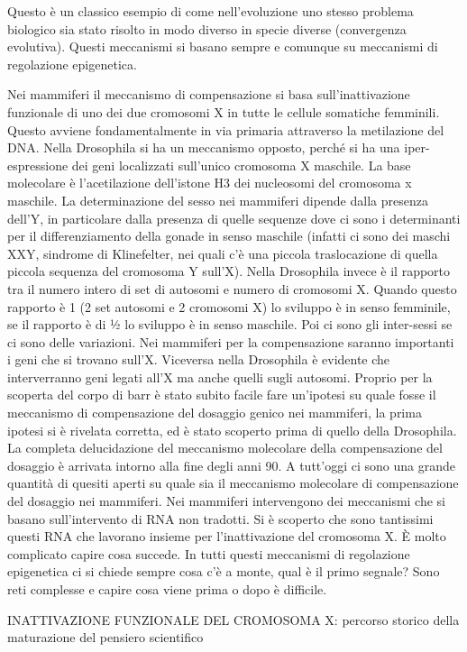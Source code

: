 \documentclass[11pt]{book}
\begin{document}
Questo è un classico esempio di come nell’evoluzione uno stesso problema biologico sia stato risolto in modo diverso in specie diverse (convergenza evolutiva). Questi meccanismi si basano sempre e comunque su meccanismi di regolazione epigenetica.

Nei mammiferi il meccanismo di compensazione si basa sull’inattivazione funzionale di uno dei due cromosomi X in tutte le cellule somatiche femminili. Questo avviene fondamentalmente in via primaria attraverso la metilazione del DNA. Nella Drosophila si ha un meccanismo opposto, perché si ha una iper-espressione dei geni localizzati sull’unico cromosoma X maschile.
La base molecolare è l’acetilazione dell’istone H3 dei nucleosomi del cromosoma x maschile. La determinazione del sesso nei mammiferi dipende dalla presenza dell’Y, in particolare dalla presenza di quelle sequenze dove ci sono i determinanti per il differenziamento della gonade in senso maschile (infatti ci sono dei maschi XXY, sindrome di Klinefelter, nei quali c’è una piccola traslocazione di quella piccola sequenza del cromosoma Y sull’X). Nella Drosophila invece è il rapporto tra il numero intero di set di autosomi e numero di cromosomi X. Quando questo rapporto è 1 (2 set autosomi e 2 cromosomi X) lo sviluppo è in senso femminile, se il rapporto è di ½ lo sviluppo è in senso maschile. Poi ci sono gli inter-sessi se ci sono delle variazioni.
Nei mammiferi per la compensazione saranno importanti i geni che si trovano sull’X. Viceversa nella Drosophila è evidente che interverranno geni legati all’X ma anche quelli sugli autosomi.
Proprio per la scoperta del corpo di barr è stato subito facile fare un’ipotesi su quale fosse il meccanismo di compensazione del dosaggio genico nei mammiferi, la prima ipotesi si è rivelata corretta, ed è stato scoperto prima di quello della Drosophila. La completa delucidazione del meccanismo molecolare della compensazione del dosaggio è arrivata intorno alla fine degli anni 90.
A tutt’oggi ci sono una grande quantità di quesiti aperti su quale sia il meccanismo molecolare di compensazione del dosaggio nei mammiferi.
Nei mammiferi intervengono dei meccanismi che si basano sull’intervento di RNA non tradotti. Si è scoperto che sono tantissimi questi RNA che lavorano insieme per l’inattivazione del cromosoma X. È molto complicato capire cosa succede. In tutti questi meccanismi di regolazione epigenetica ci si chiede sempre cosa c’è a monte, qual è il primo segnale? Sono reti complesse e capire cosa viene prima o dopo è difficile. 

INATTIVAZIONE FUNZIONALE DEL CROMOSOMA X:
percorso storico della maturazione del pensiero scientifico
\end{document}
